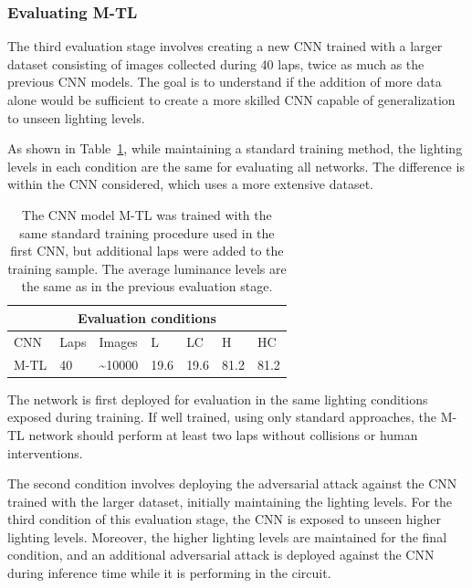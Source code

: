 \documentclass[12pt]{article}
\begin{document}
\subsubsection{Evaluating M-TL}

The third evaluation stage involves creating a new CNN trained with a larger dataset consisting of images collected during 40 laps, twice as much as the previous CNN models. The goal is to understand if the addition of more data alone would be sufficient to create a more skilled CNN capable of generalization to unseen lighting levels. 

As shown in Table~\ref{tab:test2method}, while maintaining a standard training method, the lighting levels in each condition are the same for evaluating all networks. The difference is within the CNN considered, which uses a more extensive dataset. 

\begin{table}[h]
\begin{center}
\begin{tabular}{ |p{3cm}|p{1cm}|p{2cm}|p{1cm}|p{1cm}|p{1cm}|p{1cm}|  }
 \hline
 \multicolumn{7}{|c|}{Evaluation conditions} \\
 \hline
 CNN & Laps & Images & L & LC & H & HC \\
 \hline
 M-TL & 40 & \textasciitilde10000 & 19.6 & 19.6 & 81.2 & 81.2\\
\hline
\end{tabular}
\caption{\label{tab:test2method} The CNN model M-TL was trained with the same standard training procedure used in the first CNN, but additional laps were added to the training sample. The average luminance levels are the same as in the previous evaluation stage. }
\end{center}
\end{table}

The network is first deployed for evaluation in the same lighting conditions exposed during training. If well trained, using only standard approaches, the M-TL network should perform at least two laps without collisions or human interventions. 

The second condition involves deploying the adversarial attack against the CNN trained with the larger dataset, initially maintaining the lighting levels. For the third condition of this evaluation stage, the CNN is exposed to unseen higher lighting levels. Moreover, the higher lighting levels are maintained for the final condition, and an additional adversarial attack is deployed against the CNN during inference time while it is performing in the circuit.
\end{document}
